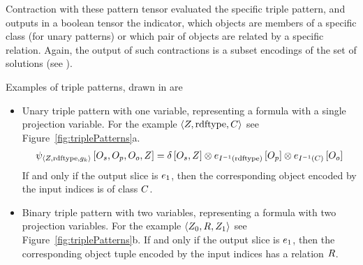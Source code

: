 Contraction with these pattern tensor evaluated the specific triple pattern, and outputs in a boolean tensor the indicator, which objects are members of a specific class (for unary patterns) or which pair of objects are related by a specific relation.
Again, the output of such contractions is a subset encodings of the set of solutions (see ).


Examples of triple patterns, drawn in  are
\begin{itemize}
    \item Unary triple pattern with one variable, representing a formula with a single projection variable.
    For the example $\braket{Z,\mathrm{rdftype},C}$ see Figure~\ref{fig:triplePatterns}a.
    \begin{align*}
        \psi_{\braket{Z,\mathrm{rdftype},g_{k}}}\left[
            O_{s}, O_{p}, O_{o}, Z
        \right]
        = \delta\left[O_{s},Z\right]
        \otimes e_{I^{-1}(\mathrm{rdftype})}\left[O_{p}\right]
        \otimes e_{I^{-1}(C)}\left[O_{o}\right]
    \end{align*}
    If and only if the output slice is $e_1$, then the corresponding object encoded by the input indices is of class $C$.
    \item Binary triple pattern with two variables, representing a formula with two projection variables.
    For the example  $\braket{Z_{0},R,Z_{1}}$ see Figure~\ref{fig:triplePatterns}b.
    If and only if the output slice is $e_1$, then the corresponding object tuple encoded by the input indices has a relation $R$.
\end{itemize}



